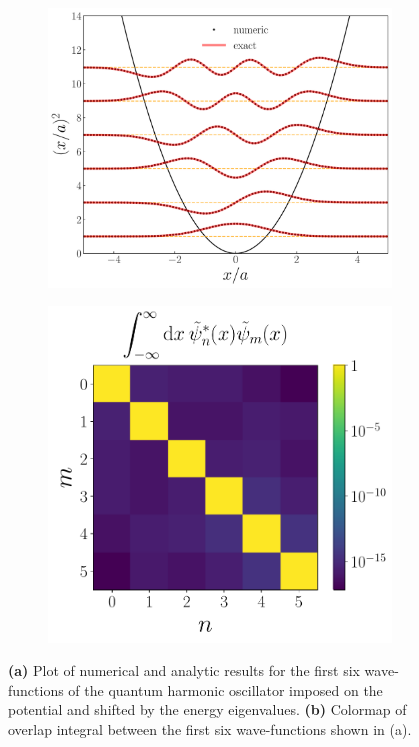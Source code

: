 \begin{figure}[h!tb]
\centering
\begin{subfigure}{0.49\linewidth}
    \centering
    \includegraphics[width=\linewidth]{ho_wfs.pdf}
    \caption{}
    \label{fig:ho-wfs}
\end{subfigure}
\bigskip
\begin{subfigure}{0.49\linewidth}
    \centering
    \includegraphics[width=\linewidth]{ho_orthonormality.pdf}
    \caption{}
    \label{fig:ho-orthonormality}
\end{subfigure}
\caption{\textbf{(a)} Plot of numerical and analytic results for the first six wave-functions of the quantum harmonic oscillator imposed on the potential and shifted by the energy eigenvalues. \textbf{(b)} Colormap of overlap integral between the first six wave-functions shown in (a).}
\label{fig:ho-wfs-orthonormality}
\end{figure}


